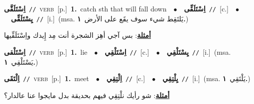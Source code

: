 \documentclass[10pt,a4paper,twoside]{article} %
\begin{document}
\begin{multicols}{2}
{\setlength\topsep{0pt}\textbf{\foreignlanguage{arabic}{اِسْتَلَقَّى}}\ {\color{gray}\texttt{//}\color{black}}\ \textsc{verb}\ [p.]\ \textbf{1.}~catch sth that will fall down\ \ $\bullet$\ \ \setlength\topsep{0pt}\textbf{\foreignlanguage{arabic}{اِسْتَلَقِّى}}\ {\color{gray}\texttt{//}\color{black}}\ [c.]\ \ $\bullet$\ \ \setlength\topsep{0pt}\textbf{\foreignlanguage{arabic}{يِسْتَلَقِّى}}\ {\color{gray}\texttt{//}\color{black}}\ [i.]\ \color{gray}(msa. \foreignlanguage{arabic}{يَلتَقِط شيء سوف يقَع على الأرض}~\foreignlanguage{arabic}{\textbf{١.}})\color{black}\  \begin{flushright}\color{gray}\foreignlanguage{arabic}{\textbf{\underline{\foreignlanguage{arabic}{أمثلة}}}: بس آجي أهِز الشجرة أنت مِد إِيدك واِسْتَلَقِّيها}\end{flushright}\color{black}} \vspace{2mm}

{\setlength\topsep{0pt}\textbf{\foreignlanguage{arabic}{اِسْتَلْقى}}\ {\color{gray}\texttt{//}\color{black}}\ \textsc{verb}\ [p.]\ \textbf{1.}~lie\ \ $\bullet$\ \ \setlength\topsep{0pt}\textbf{\foreignlanguage{arabic}{اِسْتَلْقِي}}\ {\color{gray}\texttt{//}\color{black}}\ [c.]\ \ $\bullet$\ \ \setlength\topsep{0pt}\textbf{\foreignlanguage{arabic}{يِسْتَلْقِي}}\ {\color{gray}\texttt{//}\color{black}}\ [i.]\ \color{gray}(msa. \foreignlanguage{arabic}{يَسْتَلْقِي}~\foreignlanguage{arabic}{\textbf{١.}})\color{black}\ } \vspace{2mm}

{\setlength\topsep{0pt}\textbf{\foreignlanguage{arabic}{اِلْتَقَى}}\ {\color{gray}\texttt{//}\color{black}}\ \textsc{verb}\ [p.]\ \textbf{1.}~meet\ \ $\bullet$\ \ \setlength\topsep{0pt}\textbf{\foreignlanguage{arabic}{اِلْتِقِي}}\ {\color{gray}\texttt{//}\color{black}}\ [c.]\ \ $\bullet$\ \ \setlength\topsep{0pt}\textbf{\foreignlanguage{arabic}{يِلْتِقِي}}\ {\color{gray}\texttt{//}\color{black}}\ [i.]\ \color{gray}(msa. \foreignlanguage{arabic}{يَلْتَقِي}~\foreignlanguage{arabic}{\textbf{١.}})\color{black}\  \begin{flushright}\color{gray}\foreignlanguage{arabic}{\textbf{\underline{\foreignlanguage{arabic}{أمثلة}}}: شو رأيك نلْتِقِي فيهم بحديقة بدل مايجوا عنا عالدار؟}\end{flushright}\color{black}} \vspace{2mm}


\end{multicols}
\end{document}
